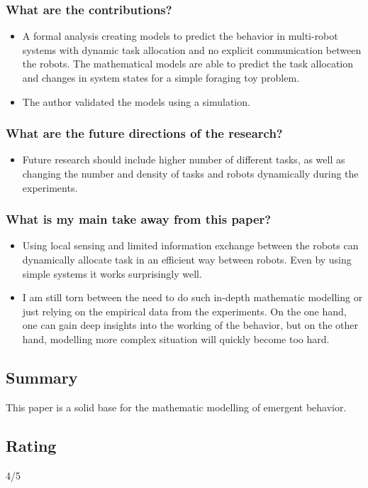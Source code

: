     \subsubsection*{What are the contributions?}
    \begin{itemize}
        \item A formal analysis creating models to predict the behavior in multi-robot systems with dynamic task allocation and no explicit communication between the robots. The mathematical models are able to predict the task allocation and changes in system states for a simple foraging toy problem.
        \item The author validated the models using a simulation.
    \end{itemize}
    \subsubsection*{What are the future directions of the research?}
    \begin{itemize}
        \item Future research should include higher number of different tasks, as well as changing the number and density of tasks and robots dynamically during the experiments.
    \end{itemize}
    \subsubsection*{What is my main take away from this paper?}
    \begin{itemize}
        \item Using local sensing and limited  information exchange between the robots can dynamically allocate task in an efficient way between robots. Even by using simple systems it works surprisingly well.
        \item I am still torn between the need to do such in-depth mathematic modelling or just relying on the empirical data from the experiments. On the one hand, one can gain deep insights into the working of the behavior, but on the other hand, modelling more complex situation will quickly become too hard.
    \end{itemize}
    
    \subsection*{Summary}
    This paper is a solid base for the mathematic modelling of emergent behavior.  
    \subsection*{Rating}
    4/5

